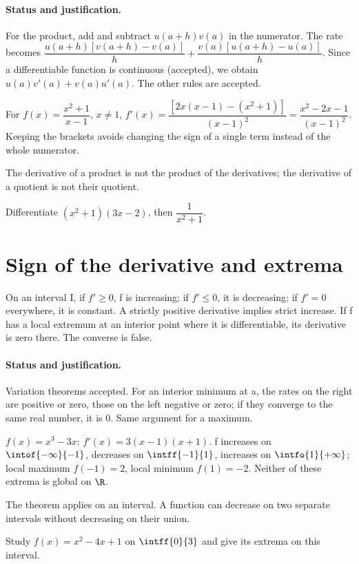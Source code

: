 \paragraph{Status and justification.} For the product, add and subtract $u(a+h)v(a)$ in the numerator. The rate becomes $\dfrac{u(a+h)[v(a+h)-v(a)]}{h}+\dfrac{v(a)[u(a+h)-u(a)]}{h}$. Since a differentiable function is continuous (accepted), we obtain $u(a)v\prime(a)+v(a)u\prime(a)$. The other rules are accepted.
\begin{example}For $f(x)=\dfrac{x^2+1}{x-1}$, $x\ne1$, $f\prime (x)=\dfrac{[2x(x-1)-(x^2+1)]}{(x-1)^2}=\dfrac{x^2-2x-1}{(x-1)^2}$. Keeping the brackets avoids changing the sign of a single term instead of the whole numerator.\end{example}\label{C06-EX2}
\begin{pitfall}The derivative of a product is not the product of the derivatives; the derivative of a quotient is not their quotient.\end{pitfall}
\begin{application}Differentiate $(x^2+1)(3x-2)$, then $\dfrac{1}{x^2+1}$.\end{application}\label{C06-AP2}
\section{Sign of the derivative and extrema}\label{C06-U3}
\begin{keypoint}
On an interval I, if $f\prime\geq0$, f is increasing; if $f\prime\leq0$, it is decreasing; if $f\prime=0$ everywhere, it is constant. A strictly positive derivative implies strict increase. If f has a local extremum at an interior point where it is differentiable, its derivative is zero there. The converse is false.
\end{keypoint}
\paragraph{Status and justification.} Variation theorems accepted. For an interior minimum at a, the rates on the right are positive or zero, those on the left negative or zero; if they converge to the same real number, it is 0. Same argument for a maximum.
\begin{example}$f(x)=x^3-3x$: $f\prime(x)=3(x-1)(x+1)$. f increases on $\intof{-\infty}{-1}$, decreases on $\intff{-1}{1}$, increases on $\intfo{1}{+\infty}$; local maximum $f(-1)=2$, local minimum $f(1)=-2$. Neither of these extrema is global on $\R$.\end{example}\label{C06-EX3}
\begin{pitfall}The theorem applies on an interval. A function can decrease on two separate intervals without decreasing on their union.\end{pitfall}
\begin{application}Study $f(x)=x^2-4x+1$ on $\intff{0}{3}$ and give its extrema on this interval.\end{application}\label{C06-AP3}
